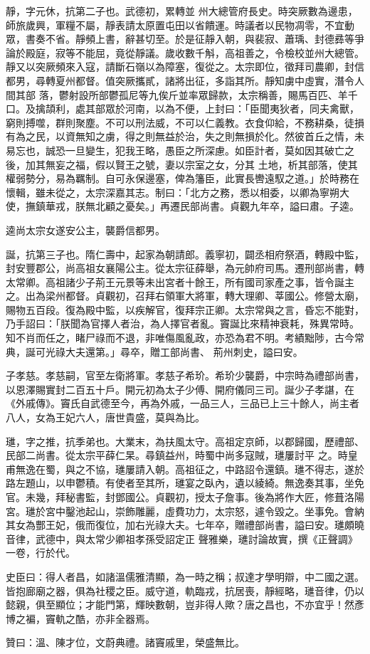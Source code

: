 \begin{pinyinscope}
 靜，字元休，抗第二子也。武德初，累轉並
 州大總管府長史。時突厥數為邊患，師旅歲興，軍糧不屬，靜表請太原置屯田以省饋運。時議者以民物凋零，不宜動眾，書奏不省。靜頻上書，辭甚切至。於是征靜入朝，與裴寂、蕭瑀、封德彞等爭論於殿庭，寂等不能屈，竟從靜議。歲收數千斛，高祖善之，令檢校並州大總管。靜又以突厥頻來入寇，請斷石嶺以為障塞，復從之。太宗即位，徵拜司農卿，封信都男，尋轉夏州都督。值突厥攜貳，諸將出征，多詣其所。靜知虜中虛實，潛令人間其部
 落，鬱射設所部鬱孤尼等九俟斤並率眾歸款，太宗稱善，賜馬百匹、羊千口。及擒頡利，處其部眾於河南，以為不便，上封曰：「臣聞夷狄者，同夫禽獸，窮則搏噬，群則聚塵。不可以刑法威，不可以仁義教。衣食仰給，不務耕桑，徒損有為之民，以資無知之虜，得之則無益於治，失之則無損於化。然彼首丘之情，未易忘也，誠恐一旦變生，犯我王略，愚臣之所深慮。如臣計者，莫如因其破亡之後，加其無妄之福，假以賢王之號，妻以宗室之女，分其
 土地，析其部落，使其權弱勢分，易為羈制。自可永保邊塞，俾為籓臣，此實長轡遠馭之道。」於時務在懷輯，雖未從之，太宗深嘉其志。制曰：「北方之務，悉以相委，以卿為寧朔大使，撫鎮華戎，朕無北顧之憂矣。」再遷民部尚書。貞觀九年卒，謚曰肅。子逵。



 逵尚太宗女遂安公主，襲爵信都男。



 誕，抗第三子也。隋仁壽中，起家為朝請郎。義寧初，闢丞相府祭酒，轉殿中監，封安豐郡公，尚高祖女襄陽公主。從太宗征薛舉，為元帥府司馬。遷刑部尚書，轉
 太常卿。高祖諸少子荊王元景等未出宮者十餘王，所有國司家產之事，皆令誕主之。出為梁州都督。貞觀初，召拜右領軍大將軍，轉大理卿、莘國公。修營太廟，賜物五百段。復為殿中監，以疾解官，復拜宗正卿。太宗常與之言，昏忘不能對，乃手詔曰：「朕聞為官擇人者治，為人擇官者亂。竇誕比來精神衰耗，殊異常時。知不肖而任之，睹尸祿而不退，非唯傷風亂政，亦恐為君不明。考績黜陟，古今常典，誕可光祿大夫還第。」尋卒，贈工部尚書、
 荊州刺史，謚曰安。



 子孝慈。孝慈嗣，官至左衛將軍。孝慈子希玠。希玠少襲爵，中宗時為禮部尚書，以恩澤賜實封二百五十戶。開元初為太子少傅、開府儀同三司。誕少子孝諶，在《外戚傳》。竇氏自武德至今，再為外戚，一品三人，三品已上三十餘人，尚主者八人，女為王妃六人，唐世貴盛，莫與為比。



 璡，字之推，抗季弟也。大業末，為扶風太守。高祖定京師，以郡歸國，歷禮部、民部二尚書。從太宗平薛仁杲。尋鎮益州，時蜀中尚多寇賊，璡屢討平
 之。時皇甫無逸在蜀，與之不協，璡屢請入朝。高祖征之，中路詔令還鎮。璡不得志，遂於路左題山，以申鬱積。有使者至其所，璡宴之臥內，遺以綾綺。無逸奏其事，坐免官。未幾，拜秘書監，封鄧國公。貞觀初，授太子詹事。後為將作大匠，修葺洛陽宮。璡於宮中鑿池起山，崇飾雕麗，虛費功力，太宗怒，遽令毀之。坐事免。會納其女為酆王妃，俄而復位，加右光祿大夫。七年卒，贈禮部尚書，謚曰安。璡頗曉音律，武德中，與太常少卿祖孝孫受詔定正
 聲雅樂，璡討論故實，撰《正聲調》一卷，行於代。



 史臣曰：得人者昌，如諸溫儒雅清顯，為一時之稱；叔達才學明辯，中二國之選。皆抱廊廟之器，俱為社稷之臣。威守道，軌臨戎，抗居喪，靜經略，璡音律，仍以懿親，俱至顯位；才能門第，輝映數朝，豈非得人歟？唐之昌也，不亦宜乎！然彥博之褊，竇軌之酷，亦非全器焉。



 贊曰：溫、陳才位，文蔚典禮。諸竇戚里，榮盛無比。



\end{pinyinscope}
